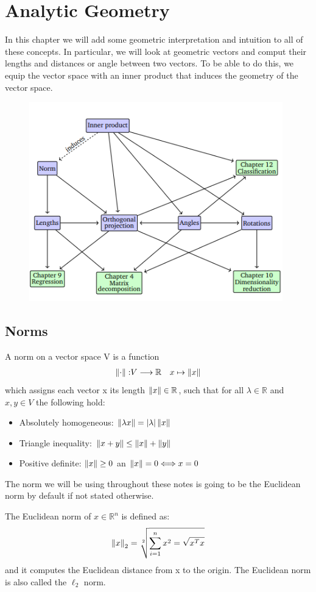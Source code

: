 \section*{Analytic Geometry}
In this chapter we will add some geometric interpretation and intuition to all of these concepts. In particular, we will look at geometric vectors and comput their lengths and distances or angle between two vectors. To be able to do this, we equip the vector space with an inner product that induces the geometry of the vector space.
\begin{figure}[htbp]
    \centering
    \includegraphics[width=11cm]{Analytical Geometry/mindmap.png}
\end{figure}
\subsection*{Norms}
\begin{definition}[Norm]
    A norm on a vector space V is a function 
    \begin{align*}
        \left\lVert\cdot\right\rVert: &V \longrightarrow \mathbb{R}
        &x \mapsto \left\lVert x\right\rVert
    \end{align*}
    which assigns each vector x its length $\left\lVert x\right\rVert \in \mathbb{R}$, such that for all $\lambda \in \mathbb{R}$ and $x,y \in V$ the following hold: 
    \begin{itemize}
        \item Absolutely homogeneous: $\left\lVert\lambda x\right\rVert = \left\lvert\lambda\right\rvert\left\lVert x\right\rVert$
        \item Triangle inequality: $\left\lVert x+y\right\rVert \leq \left\lVert x\right\rVert + \left\lVert y\right\rVert$
        \item Positive definite: $\left\lVert x\right\rVert \geq 0$ an $\left\lVert x\right\rVert = 0 \Longleftrightarrow x = 0$
    \end{itemize}
\end{definition}
The norm we will be using throughout these notes is going to be the Euclidean norm by default if not stated otherwise.
\begin{definition}
    The Euclidean norm of $x\in \mathbb{R}^n$ is defined as:
    \[ 
        \left\lVert x\right\rVert_{2} = \sqrt[2]{\sum_{i=1}^{n}{x^2} = \sqrt{x^Tx}}
    \]and it computes the Euclidean distance from x to the origin. The Euclidean norm is also called the $\ell_2$ norm.
\end{definition}
